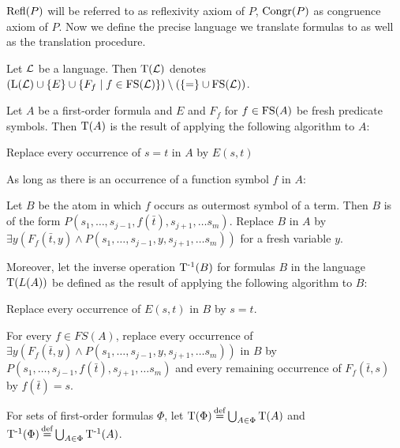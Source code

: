 $\operatorname{Refl}(P)$ will be referred to as reflexivity axiom of $P$, $\operatorname{Congr}(P)$ as congruence axiom of $P$.
Now we define the precise language we translate formulas to as well as the translation procedure.

\begin{defi}
	Let $\operatorname{\mathcal{L}}$ be a language.
	Then $\operatorname{T}(\operatorname{\mathcal{L}})$ denotes $(\Lang(\LangSym)\cup \{E\}\cup\{F_f\mid f \in \FS(\LangSym)\}) \setminus(\{=\nolinebreak \} \cup\nolinebreak \FS(\LangSym))$.
\end{defi}

\begin{defi}
	\label{def:trans}
	Let $A$ be a first-order formula and $E$ and $F_f$ for $f \in \operatorname{FS}(A)$ be fresh predicate symbols.
	Then $\operatorname{T}(A)$ is the result of applying the following algorithm to $A$:

	\begin{compactenum}
	\item Replace every occurrence of $s=t$ in $A$ by $E(s, t)$
	\label{def:trans_step1}
	\item As long as there is an occurrence of a function symbol $f$ in $A$:
	\label{def:trans_step2}

		Let $B$ be the atom in which $f$ occurs as outermost symbol of a term.
		Then $B$ is of the form $P(s_1, \ldots, s_{j-1}, f(\bar t),\allowbreak s_{j+1}, \ldots s_m)$.
		Replace $B$ in $A$ by $\exists y (F_f(\bar t, y) \land P(s_1, \ldots, s_{j-1}, y, s_{j+1}, \ldots s_m))$ for a fresh variable $y$.
	\end{compactenum}
	\medskip

	Moreover, let the inverse operation $\operatorname{T^{-1}}(B)$ for formulas $B$ in the language $\operatorname{T}(L(A))$ be defined as the result of applying the following algorithm to $B$:
	\begin{compactenum}
	\item Replace every occurrence of $E(s, t)$ in $B$ by $s=t$.
	\item For every $f \in FS(A)$, replace every occurrence of 
		$\exists y (F_f(\bar t, y) \land P(s_1, \ldots, s_{j-1},\allowbreak y,\allowbreak s_{j+1}, \ldots s_m))$
		in $B$ by $P(s_1, \ldots, s_{j-1},\allowbreak f(\bar t),\allowbreak s_{j+1}, \ldots s_m)$ and every remaining occurrence of $F_f(\bar t, s)$ by $f(\bar t) = s$.
	\end{compactenum}

	For sets of first-order formulas $\Phi$, let $\operatorname{T}(\Phi) \operatorname{\stackrel{\mathrm{def}}{=}} \bigcup_{A\in\Phi} \operatorname{T}(A)$ and 
$\operatorname{T^{-1}}(\Phi) \operatorname{\stackrel{\mathrm{def}}{=}} \bigcup_{A\in\Phi} \operatorname{T^{-1}}(A)$.
\end{defi}

